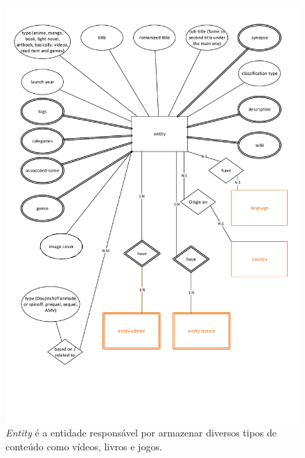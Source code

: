 \documentclass[12pt]{article}
\begin{document}
\begin{figure}[H]
\centering
\includegraphics[width=1\textwidth]{MER_-_Entity.pdf}
\caption{\textit{Entity} é a entidade responsável por armazenar diversos tipos de conteúdo como vídeos, livros e jogos.} \label{entity}
\end{figure}
\end{document}
